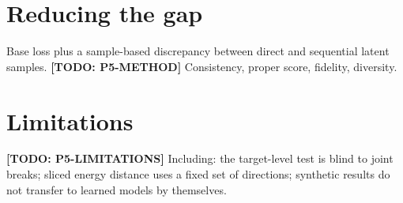 \documentclass{article}
\newcommand{\todo}[1]{\textbf{[TODO: #1]}}
\begin{document}
\section{Reducing the gap}
Base loss plus a sample-based discrepancy between direct and sequential latent
samples. \todo{P5-METHOD} Consistency, proper score, fidelity, diversity.

\section{Limitations}
\todo{P5-LIMITATIONS} Including: the target-level test is blind to joint
breaks; sliced energy distance uses a fixed set of directions; synthetic
results do not transfer to learned models by themselves.
\end{document}
